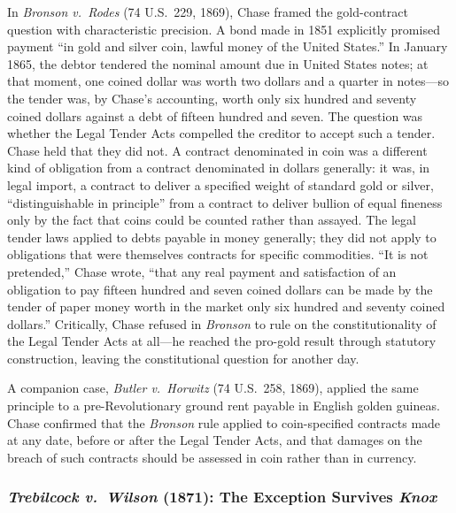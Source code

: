 \documentclass[12pt]{article}
\begin{document}
In \textit{Bronson v.\ Rodes} (74 U.S.\ 229, 1869), Chase framed the
gold-contract question with characteristic precision.  A bond made in 1851
explicitly promised payment ``in gold and silver coin, lawful money of the
United States.''  In January 1865, the debtor tendered the nominal amount
due in United States notes; at that moment, one coined dollar was worth two
dollars and a quarter in notes---so the tender was, by Chase's accounting,
worth only six hundred and seventy coined dollars against a debt of fifteen
hundred and seven.  The question was whether the Legal Tender Acts compelled
the creditor to accept such a tender.  Chase held that they did not.  A
contract denominated in coin was a different kind of obligation from a
contract denominated in dollars generally: it was, in legal import, a
contract to deliver a specified weight of standard gold or silver,
``distinguishable in principle'' from a contract to deliver bullion of equal
fineness only by the fact that coins could be counted rather than assayed.
The legal tender laws applied to debts payable in money generally; they did
not apply to obligations that were themselves contracts for specific
commodities.  ``It is not pretended,'' Chase wrote, ``that any real payment
and satisfaction of an obligation to pay fifteen hundred and seven coined
dollars can be made by the tender of paper money worth in the market only
six hundred and seventy coined dollars.''  Critically, Chase refused in
\textit{Bronson} to rule on the constitutionality of the Legal Tender Acts
at all---he reached the pro-gold result through statutory construction,
leaving the constitutional question for another day.

A companion case, \textit{Butler v.\ Horwitz} (74 U.S.\ 258, 1869),
applied the same principle to a pre-Revolutionary ground rent payable in
English golden guineas.  Chase confirmed that the \textit{Bronson} rule
applied to coin-specified contracts made at any date, before or after the
Legal Tender Acts, and that damages on the breach of such contracts should
be assessed in coin rather than in currency.

\subsubsection*{\textit{Trebilcock v.\ Wilson} (1871): The Exception
Survives \textit{Knox}}
\end{document}
